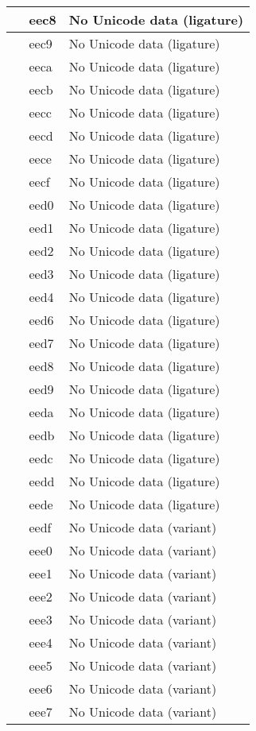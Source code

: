 \documentclass[12pt,letterpaper,openany]{book}
\begin{document}
\begin{center}
\begin{supertabular}{|m{0.25in}|m{0.5in}|m{4in}|}
 & eec8 & No Unicode data (ligature)\\\hline
 & eec9 & No Unicode data (ligature)\\\hline
 & eeca & No Unicode data (ligature)\\\hline
 & eecb & No Unicode data (ligature)\\\hline
 & eecc & No Unicode data (ligature)\\\hline
 & eecd & No Unicode data (ligature)\\\hline
 & eece & No Unicode data (ligature)\\\hline
 & eecf & No Unicode data (ligature)\\\hline
 & eed0 & No Unicode data (ligature)\\\hline
 & eed1 & No Unicode data (ligature)\\\hline
 & eed2 & No Unicode data (ligature)\\\hline
 & eed3 & No Unicode data (ligature)\\\hline
 & eed4 & No Unicode data (ligature)\\\hline
 & eed6 & No Unicode data (ligature)\\\hline
 & eed7 & No Unicode data (ligature)\\\hline
 & eed8 & No Unicode data (ligature)\\\hline
 & eed9 & No Unicode data (ligature)\\\hline
 & eeda & No Unicode data (ligature)\\\hline
 & eedb & No Unicode data (ligature)\\\hline
 & eedc & No Unicode data (ligature)\\\hline
 & eedd & No Unicode data (ligature)\\\hline
 & eede & No Unicode data (ligature)\\\hline
 & eedf & No Unicode data (variant)\\\hline
 & eee0 & No Unicode data (variant)\\\hline
 & eee1 & No Unicode data (variant)\\\hline
 & eee2 & No Unicode data (variant)\\\hline
 & eee3 & No Unicode data (variant)\\\hline
 & eee4 & No Unicode data (variant)\\\hline
 & eee5 & No Unicode data (variant)\\\hline
 & eee6 & No Unicode data (variant)\\\hline
 & eee7 & No Unicode data (variant)\\\hline

\end{supertabular}
\end{center}
\end{document}
